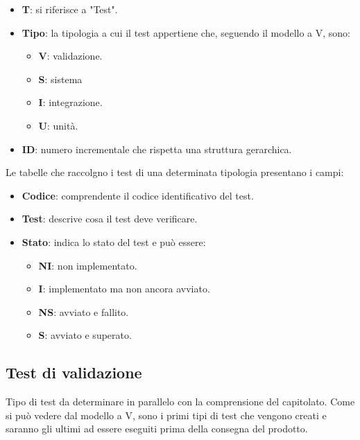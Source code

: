 \begin{itemize}
	\item \textbf{T}: si riferisce a "Test".
	\item \textbf{Tipo}: la tipologia a cui il test appertiene che, seguendo il modello a V, sono:
	\begin{itemize}
		\item \textbf{V}: validazione. %
		\item \textbf{S}: sistema
		\item \textbf{I}: integrazione.
		\item \textbf{U}: unità.
		\end{itemize}
	\item \textbf{ID}: numero incrementale che rispetta una struttura gerarchica.
\end{itemize}

\newcommand{\TNI}{{\color{gray}\textbf{NI}}}
\newcommand{\TI}{{\color{blue}\textbf{I}}}
\newcommand{\TNS}{{\color{red}\textbf{NS}}}
\newcommand{\TS}{{\color{green}\textbf{S}}}

Le tabelle che raccolgno i test di una determinata tipologia presentano i campi:
\begin{itemize}
	\item \textbf{Codice}: comprendente il codice identificativo del test.
	\item \textbf{Test}: descrive cosa il test deve verificare.
	\item \textbf{Stato}: indica lo stato del test e può essere:
	\begin{itemize}
		\item \TNI: non implementato.
		\item \TI: implementato ma non ancora avviato.
		\item \TNS: avviato e fallito.
		\item \TS: avviato e superato.
	\end{itemize}	
\end{itemize}



\subsection{Test di validazione} \label{testvalidazione} %
Tipo di test da determinare in parallelo con la comprensione del capitolato.
Come si può vedere dal modello a V, sono i primi tipi di test che vengono creati e saranno gli ultimi ad essere eseguiti prima della consegna del prodotto.

